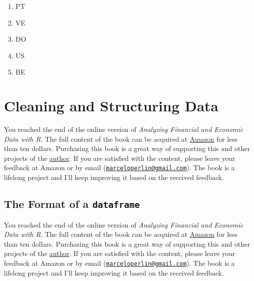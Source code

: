 \documentclass[
  12pt,
]{book}
\providecommand{\tightlist}{%
  \setlength{\itemsep}{0pt}\setlength{\parskip}{0pt}}
\newenvironment{pleasebuyit}
{\begin{noteblock}
		
	} {\end{noteblock}}
\begin{document}
\begin{enumerate}
\def\labelenumi{\alph{enumi})}
\tightlist
\item
  PT
\item
  VE
\item
  DO
\item
  US
\item
  BE
\end{enumerate}

\hypertarget{cleaning}{%
\chapter{Cleaning and Structuring Data}\label{cleaning}}

\begin{pleasebuyit}
You reached the end of the online version of \emph{Analyzing Financial
and Economic Data with R}. The full content of the book can be acquired
at \href{https://www.amazon.com/dp/B084LSNXMN}{Amazon} for less than ten
dollars. Purchasing this book is a great way of supporting this and
other projects of the \href{https://www.msperlin.com/blog/}{author}. If
you are satisfied with the content, please leave your feedback at Amazon
or by email
(\href{mailto:marceloperlin@gmail.com}{\nolinkurl{marceloperlin@gmail.com}}).
The book is a lifelong project and I'll keep improving it based on the
received feedback.
\end{pleasebuyit}

\hypertarget{the-format-of-a-dataframe}{%
\section{\texorpdfstring{The Format of a \texttt{dataframe}}{The Format of a dataframe}}\label{the-format-of-a-dataframe}}

\begin{pleasebuyit}
You reached the end of the online version of \emph{Analyzing Financial
and Economic Data with R}. The full content of the book can be acquired
at \href{https://www.amazon.com/dp/B084LSNXMN}{Amazon} for less than ten
dollars. Purchasing this book is a great way of supporting this and
other projects of the \href{https://www.msperlin.com/blog/}{author}. If
you are satisfied with the content, please leave your feedback at Amazon
or by email
(\href{mailto:marceloperlin@gmail.com}{\nolinkurl{marceloperlin@gmail.com}}).
The book is a lifelong project and I'll keep improving it based on the
received feedback.
\end{pleasebuyit}
\end{document}
